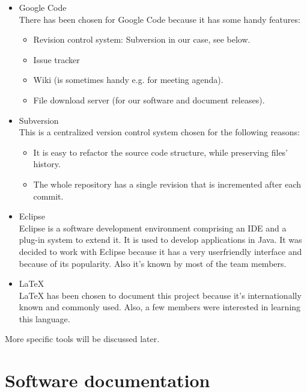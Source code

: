 \documentclass[a4paper, 12pt]{report}
\begin{document}
			\begin{itemize}
				
				\item Google Code \\
				There has been chosen for Google Code because it has some 
				handy features:
				
				\begin{itemize}
			 		\item Revision control system: Subversion in our case, see below.
					\item Issue tracker
					\item Wiki (is sometimes handy e.g. for meeting agenda).
					\item File download server (for our software and document releases).
				\end{itemize}

				\item Subversion \\
				This is a centralized version control system chosen for the 
				following reasons:
				
				\begin{itemize}
					\item It is easy to refactor the source code structure, 
					while preserving files' history.
					\item The whole repository has a single revision that is 
					incremented after each commit.
				\end{itemize}

				\item Eclipse \\
				Eclipse is a software development environment comprising an IDE and 
				a plug-in system to extend it. It is used to develop applications in 
				Java. It was decided to work with Eclipse because 
				it has a very userfriendly interface and because of its popularity. Also it's 
				known by most of the team members.
				
				\item \LaTeX \\
				 \LaTeX{} has been chosen to document this project because it's 
				internationally known and commonly used. Also, a few members 
				were interested in learning this language.
				
			\end{itemize}	
			
			More specific tools will be discussed later.
			
			\section{Software documentation}
			
\end{document}
